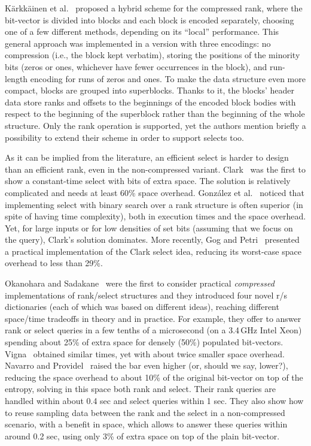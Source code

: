 \documentclass{llncs}
\begin{document}
K{\"{a}}rkk{\"{a}}inen et al.~\cite{KKP14} proposed a hybrid scheme 
for the compressed rank, where the bit-vector is divided into blocks 
and each block is encoded separately, choosing one of a few different methods, 
depending on its ``local'' performance.
This general approach was implemented in a version with three encodings:
no compression (i.e., the block kept verbatim), storing the positions of the 
minority bits (zeros or ones, whichever have fewer occurrences in the block), 
and run-length encoding for runs of zeros and ones.
To make the data structure even more compact, blocks are grouped into 
superblocks. 
Thanks to it, the blocks' header data store ranks and offsets to 
the beginnings of the encoded block bodies with respect to the beginning 
of the superblock rather than the beginning of the whole structure.
Only the rank operation is supported, yet the authors mention briefly 
a possibility to extend their scheme in order to support selects too.

As it can be implied from the literature, an efficient select 
is harder to design than an efficient rank, even in the non-compressed variant.
Clark~\cite{Clark1996} was the first to show a constant-time select 
with  
bits of extra space.
The solution is relatively complicated and needs at least 60\% space overhead.
Gonz{\'a}lez et al.~\cite{GGMN05} noticed that implementing 
select with binary search over a rank structure is often superior
(in spite of having  time complexity), 
both in execution times and the space overhead.
Yet, for large inputs or for low densities of set bits (assuming 
that we focus on the  query), Clark's solution dominates.
More recently, Gog and Petri~\cite{GP13} presented a practical implementation 
of the Clark select idea, reducing its worst-case space overhead 
to less than 29\%.

Okanohara and Sadakane~\cite{OkanoharaS07} were the first to consider 
practical {\em compressed} implementations of rank/select structures 
and they introduced four novel r/s dictionaries 
(each of which was based on different ideas), reaching different 
space/time tradeoffs in theory and in practice.
For example, they offer to answer rank or select queries 
in a few tenths of a microsecond (on a 3.4\,GHz Intel Xeon) 
spending about 25\% of extra space for densely (50\%) populated bit-vectors.
Vigna~\cite{V08} obtained similar times, yet with about twice smaller 
space overhead.
Navarro and Providel~\cite{NPsea12} raised the bar even higher 
(or, should we say, lower?), reducing the space overhead to about 
10\% of the original bit-vector on top of the entropy, solving 
in this space both rank and select. 
Their rank queries are handled within about 0.4 sec and 
select queries within 1 sec.
They also show how to reuse sampling data between the rank and the select 
in a non-compressed scenario, 
with a benefit in space, which allows to answer these queries 
within around 0.2 sec, using only 3\% of extra space on top of 
the plain bit-vector.
\end{document}
